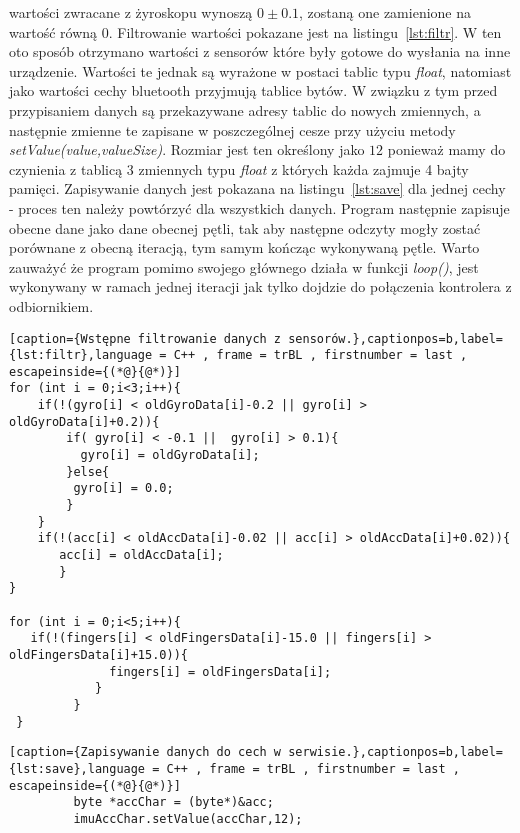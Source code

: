 wartości zwracane z żyroskopu wynoszą $0\pm 0.1$, zostaną one zamienione na wartość równą $0$. Filtrowanie wartości pokazane jest na listingu~\ref{lst:filtr}. W ten oto sposób otrzymano wartości z sensorów które były gotowe do wysłania na inne urządzenie. Wartości te jednak są wyrażone w postaci tablic typu \textit{float}, natomiast jako wartości cechy bluetooth przyjmują tablice bytów. W związku z tym przed przypisaniem danych są przekazywane adresy tablic do nowych zmiennych, a następnie zmienne te zapisane w poszczególnej cesze przy użyciu metody \textit{setValue(value,valueSize)}. Rozmiar jest ten określony jako $12$ ponieważ mamy do czynienia z tablicą 3 zmiennych typu \textit{float} z których każda zajmuje 4 bajty pamięci. Zapisywanie danych jest pokazana na listingu~\ref{lst:save} dla jednej cechy - proces ten należy powtórzyć dla wszystkich danych. Program następnie zapisuje obecne dane jako dane obecnej pętli, tak aby następne odczyty mogły zostać porównane z obecną iteracją, tym samym kończąc wykonywaną pętle. Warto zauważyć że program pomimo swojego głównego działa w funkcji \textit{loop()}, jest wykonywany w ramach jednej iteracji jak tylko dojdzie do połączenia kontrolera z odbiornikiem.
\begin{lstlisting}[caption={Wstępne filtrowanie danych z sensorów.},captionpos=b,label={lst:filtr},language = C++ , frame = trBL , firstnumber = last , escapeinside={(*@}{@*)}]
for (int i = 0;i<3;i++){
	if(!(gyro[i] < oldGyroData[i]-0.2 || gyro[i] > oldGyroData[i]+0.2)){
		if( gyro[i] < -0.1 ||  gyro[i] > 0.1){              
	      gyro[i] = oldGyroData[i];
	    }else{
	     gyro[i] = 0.0;
	    }
	}	            
	if(!(acc[i] < oldAccData[i]-0.02 || acc[i] > oldAccData[i]+0.02)){
	   acc[i] = oldAccData[i];
	   }
}

for (int i = 0;i<5;i++){
   if(!(fingers[i] < oldFingersData[i]-15.0 || fingers[i] > oldFingersData[i]+15.0)){
              fingers[i] = oldFingersData[i];
            }
         }         
 }
\end{lstlisting}

\begin{lstlisting}[caption={Zapisywanie danych do cech w serwisie.},captionpos=b,label={lst:save},language = C++ , frame = trBL , firstnumber = last , escapeinside={(*@}{@*)}]
         byte *accChar = (byte*)&acc;
         imuAccChar.setValue(accChar,12);
\end{lstlisting}

